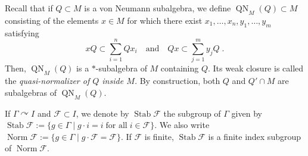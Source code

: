 \documentclass[a4paper,11pt]{amsart}
\numberwithin{equation}{section}
\begin{document}
Recall that if $Q \subset M$ is a von Neumann subalgebra, we define ${\operatorname{QN}}_M(Q) \subset M$ consisting of the elements $x \in M$ for which there exist $x_1,\ldots,x_n,y_1,\ldots,y_m$ satisfying
$$x Q \subset \sum_{i=1}^n Q x_i \quad\text{and}\quad Q x \subset \sum_{j=1}^m y_j Q \; .$$
Then, ${\operatorname{QN}}_M(Q)$ is a $*$-subalgebra of $M$ containing $Q$. Its weak closure is called the \emph{quasi-normalizer of $Q$ inside $M$.} By construction, both $Q$ and $Q' \cap M$ are subalgebras of ${\operatorname{QN}}_M(Q)$.

If $\Gamma {\curvearrowright} I$ and ${\mathcal{F}} \subset I$, we denote by ${\operatorname{Stab}} {\mathcal{F}}$ the subgroup of $\Gamma$ given by ${\operatorname{Stab}} {\mathcal{F}} := \{g \in \Gamma \mid g \cdot i = i \;\text{for all}\; i \in {\mathcal{F}}\}$. We also write ${\operatorname{Norm}} {\mathcal{F}} := \{g \in \Gamma \mid g \cdot {\mathcal{F}} = {\mathcal{F}} \}$. If ${\mathcal{F}}$ is finite, ${\operatorname{Stab}} {\mathcal{F}}$ is a finite index subgroup of ${\operatorname{Norm}} {\mathcal{F}}$.
\end{document}
